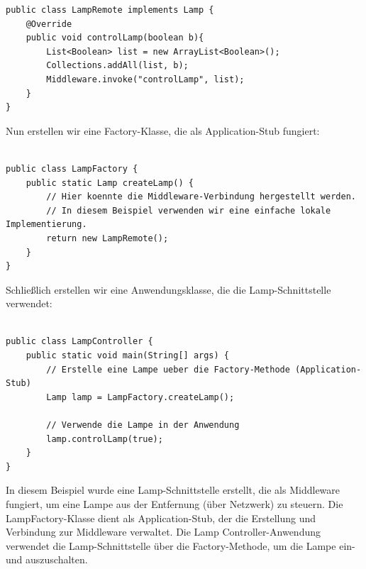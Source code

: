 \documentclass[../vs-script-first-v01.tex]{subfiles}
\begin{document}
\noindent\begin{minipage}{\textwidth}
\begin{lstlisting}[caption={RPC Remote Implementation},captionpos=b,label={lst:rpc-remote}]
public class LampRemote implements Lamp {
    @Override
    public void controlLamp(boolean b){
    	List<Boolean> list = new ArrayList<Boolean>(); 
        Collections.addAll(list, b);
        Middleware.invoke("controlLamp", list);
    }
}
\end{lstlisting}
\end{minipage}
Nun erstellen wir eine Factory-Klasse, die als Application-Stub fungiert:\\\\
\noindent\begin{minipage}{\textwidth}
\begin{lstlisting}[caption={Application Stub mit Factory Pattern},captionpos=b,label={lst:rpc-factory}]
public class LampFactory {
    public static Lamp createLamp() {
        // Hier koennte die Middleware-Verbindung hergestellt werden.
        // In diesem Beispiel verwenden wir eine einfache lokale Implementierung.
        return new LampRemote();
    }
}
\end{lstlisting}
\end{minipage}
Schließlich erstellen wir eine Anwendungsklasse, die die Lamp-Schnittstelle verwendet:\\\\
\noindent\begin{minipage}{\textwidth}
\begin{lstlisting}[caption={Controller ruft Middleware},captionpos=b,label={lst:rpc-controller}]
public class LampController {
	public static void main(String[] args) {
        // Erstelle eine Lampe ueber die Factory-Methode (Application-Stub)
        Lamp lamp = LampFactory.createLamp();

        // Verwende die Lampe in der Anwendung
        lamp.controlLamp(true);
    }
}
\end{lstlisting}
\end{minipage}
In diesem Beispiel wurde eine Lamp-Schnittstelle erstellt, die als Middleware fungiert, um eine Lampe aus der Entfernung (über Netzwerk) zu steuern. Die LampFactory-Klasse dient als Application-Stub, der die Erstellung und Verbindung zur Middleware verwaltet. Die Lamp Controller-Anwendung verwendet die Lamp-Schnittstelle über die Factory-Methode, um die Lampe ein- und auszuschalten.
\\\\
\end{document}
